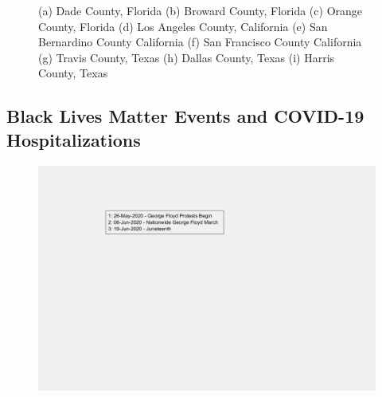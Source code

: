 \documentclass[]{article}
\begin{document}
\begin{figure}
	\caption{(a) Dade County, Florida (b) Broward County, Florida (c) Orange County, Florida (d) Los Angeles County, California (e) San Bernardino County California (f) San Francisco County California (g) Travis County, Texas (h) Dallas County, Texas (i) Harris County, Texas}
	\label{fig:foobar}
\end{figure}
\FloatBarrier
\vspace{5mm}


\subsection{Black Lives Matter Events and COVID-19 Hospitalizations}

\begin{figure}[!h]
	\includegraphics[width=\linewidth]{legends/BLM_legend.png}
	\caption{}
	\label{fig:legends/BLM_legendLabel}
\end{figure}
\end{document}
